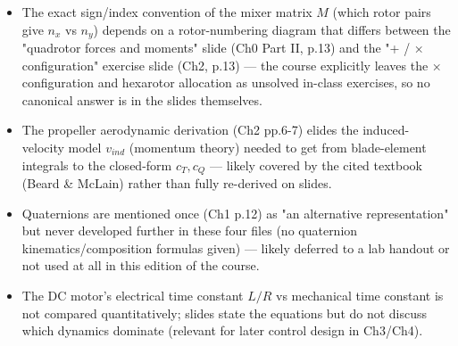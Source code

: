 \documentclass[11pt]{article}
\begin{document}
\begin{itemize}
\item The exact sign/index convention of the mixer matrix $M$ (which rotor pairs give $n_x$ vs $n_y$) depends on a rotor-numbering diagram that differs between the "quadrotor forces and moments" slide (Ch0 Part II, p.13) and the "+ / × configuration" exercise slide (Ch2, p.13) — the course explicitly leaves the × configuration and hexarotor allocation as unsolved in-class exercises, so no canonical answer is in the slides themselves.
\item The propeller aerodynamic derivation (Ch2 pp.6-7) elides the induced-velocity model $v_{ind}$ (momentum theory) needed to get from blade-element integrals to the closed-form $c_T,c_Q$ — likely covered by the cited textbook (Beard \& McLain) rather than fully re-derived on slides.
\item Quaternions are mentioned once (Ch1 p.12) as "an alternative representation" but never developed further in these four files (no quaternion kinematics/composition formulas given) — likely deferred to a lab handout or not used at all in this edition of the course.
\item The DC motor's electrical time constant $L/R$ vs mechanical time constant is not compared quantitatively; slides state the equations but do not discuss which dynamics dominate (relevant for later control design in Ch3/Ch4).
\end{itemize}
\end{document}

